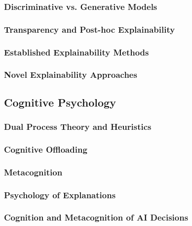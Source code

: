 \subsubsection{Discriminative vs. Generative Models} \label{sssec:disc_vs_gen}

\subsubsection{Transparency and Post-hoc Explainability} \label{sssec:transparency_posthoc}

\subsubsection{Established Explainability Methods} \label{sssec:established_methods}

\cite{Ribeiro2016}

\cite{Lundberg2017}

\subsubsection{Novel Explainability Approaches} \label{sssec:novel_approaches}

\cite{Martens2025}

\subsection{Cognitive Psychology} \label{ssec:cognitive_psychology}

\subsubsection{Dual Process Theory and Heuristics} \label{sssec:dual_process}

\cite{Kahnemann2011}

\subsubsection{Cognitive Offloading} \label{sssec:cognitive_offloading}

\subsubsection{Metacognition} \label{sssec:metacognition}

\subsubsection{Psychology of Explanations} \label{sssec:psychology_explanations}

\cite{Miller2019}

\subsubsection {Cognition and Metacognition of AI Decisions} \label{sssec:cognition_metacognition_ai}

\cite{Jussupow2021}

\cite{Shin2021}
